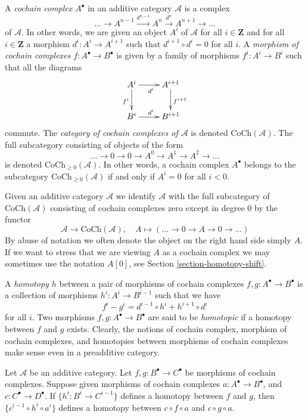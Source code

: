 \noindent
A {\it cochain complex $A^\bullet$} in an
additive category $\mathcal{A}$
is a complex
$$
\ldots \to
A^{n - 1} \xrightarrow{d^{n - 1}}
A^n \xrightarrow{d^n}
A^{n + 1} \to
\ldots
$$
of $\mathcal{A}$. In other words, we are
given an object $A^i$ of
$\mathcal{A}$ for all $i \in \mathbf{Z}$ and
for
all $i \in \mathbf{Z}$ a morphism $d^i : A^i
\to A^{i + 1}$ such that
$d^{i + 1} \circ d^i = 0$ for all $i$. A {\it
morphism of cochain
complexes $f : A^\bullet \to B^\bullet$} is
given by a
family of morphisms $f^i : A^i \to B^i$ such
that all
the diagrams
$$
\xymatrix{
A^i \ar[r]_{d^i} \ar[d]_{f^i} & A^{i + 1}
\ar[d]^{f^{i + 1}} \\
B^i \ar[r]^{d^i} & B^{i + 1}
}
$$
commute. The {\it category of cochain
complexes of $\mathcal{A}$}
is denoted $\text{CoCh}(\mathcal{A})$. The
full subcategory consisting
of objects of the form
$$
\ldots \to 0 \to 0 \to A^0 \to A^1 \to A^2
\to \ldots
$$
is denoted $\text{CoCh}_{\geq
0}(\mathcal{A})$.
In other words, a cochain complex $A^\bullet$
belongs to the subcategory
$\text{CoCh}_{\geq 0}(\mathcal{A})$ if and
only if
$A^i = 0$ for all $i < 0$.

\medskip\noindent
Given an additive category $\mathcal{A}$ we
identify $\mathcal{A}$
with the full subcategory of
$\text{CoCh}(\mathcal{A})$ consisting
of cochain complexes zero except in degree
$0$ by the functor
$$
\mathcal{A} \longrightarrow
\text{CoCh}(\mathcal{A}),\quad
A \longmapsto (\ldots \to 0 \to A \to 0 \to
\ldots)
$$
By abuse of notation we often denote the
object on the right hand side
simply $A$. If we want to stress that we are
viewing $A$ as a cochain
complex we may sometimes use the notation
$A[0]$, see
Section \ref{section-homotopy-shift}.

\medskip\noindent
A {\it homotopy $h$} between a pair of
morphisms
of cochain complexes $f, g : A^\bullet \to
B^\bullet$
is a collection of morphisms $h^i : A^i \to
B^{i - 1}$
such that we have
$$
f^i - g^i = d^{i - 1} \circ h^i + h^{i + 1}
\circ d^i
$$
for all $i$.
Two morphisms $f, g : A^\bullet \to
B^\bullet$ are
said to be {\it homotopic} if a homotopy
between $f$
and $g$ exists.
Clearly, the notions of cochain complex,
morphism of
cochain complexes, and homotopies between
morphisms of cochain complexes
make sense even in a preadditive category.

\begin{lemma}
\label{lemma-compose-homotopy-cochain}
Let $\mathcal{A}$ be an additive category.
Let $f, g : B^\bullet \to C^\bullet$ be
morphisms
of cochain complexes. Suppose given morphisms
of cochain
complexes $a : A^\bullet \to B^\bullet$, and
$c : C^\bullet \to D^\bullet$.
If $\{h^i : B^i \to C^{i - 1}\}$ defines a
homotopy
between $f$ and $g$, then $\{c^{i - 1} \circ
h^i \circ a^i\}$
defines a homotopy between $c \circ f \circ
a$ and
$c \circ g \circ a$.
\end{lemma}

